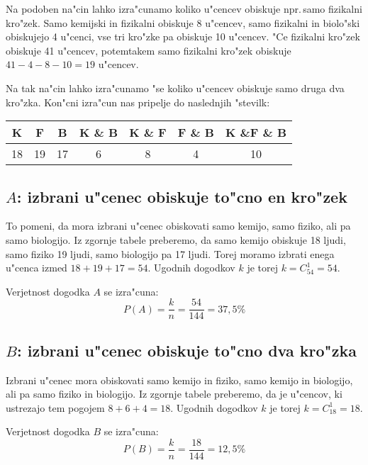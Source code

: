 \documentclass[a4paper, 12pt]{article}
\begin{document}
Na podoben na"cin lahko izra"cunamo koliko u"cencev obiskuje npr.\,samo fizikalni kro"zek. Samo kemijski in fizikalni obiskuje 8 u"cencev, samo fizikalni in biolo"ski obiskujejo 4 u"cenci, vse tri kro"zke pa obiskuje 10 u"cencev. "Ce fizikalni kro"zek obiskuje 41 u"cencev, potemtakem samo fizikalni kro"zek obiskuje $41 - 4 - 8 - 10 = 19$ u"cencev.

Na tak na"cin lahko izra"cunamo "se koliko u"cencev obiskuje samo druga dva kro"zka. Kon"cni izra"cun nas pripelje do naslednjih "stevilk:
\begin{table}[!htbp]
	\centering
	\begin{tabular}{c|c|c|c|c|c|c}
		\textbf{K} & \textbf{F} & \textbf{B} & \textbf{K \& B} & \textbf{K \& F} & \textbf{F \& B} & \textbf{K \&F \& B} \\ \hline
		18 & 19 & 17 & 6 & 8 & 4 & 10
	\end{tabular}
\end{table}

\subsection*{$A$: izbrani u"cenec obiskuje to"cno en kro"zek}
To pomeni, da mora izbrani u"cenec obiskovati samo kemijo, samo fiziko, ali pa samo biologijo. Iz zgornje tabele preberemo, da samo kemijo obiskuje 18 ljudi, samo fiziko 19 ljudi, samo biologijo pa 17 ljudi. Torej moramo izbrati enega u"cenca izmed $18  + 19 + 17 = 54$. Ugodnih dogodkov $k$ je torej $k = C_{54}^1 = 54$.

Verjetnost dogodka $A$ se izra"cuna:
\begin{equation*}
P(A) = \dfrac{k}{n} = \dfrac{54}{144} = 37,5\%
\end{equation*}

\subsection*{$B$: izbrani u"cenec obiskuje to"cno dva kro"zka}
Izbrani u"cenec mora obiskovati samo kemijo in fiziko, samo kemijo in biologijo, ali pa samo fiziko in biologijo. Iz zgornje tabele preberemo, da je u"cencov, ki ustrezajo tem pogojem $8 + 6 + 4 = 18$. Ugodnih dogodkov $k$ je torej $k = C_{18}^1 = 18$.

Verjetnost dogodka $B$ se izra"cuna:
\begin{equation*}
P(B) = \dfrac{k}{n} = \dfrac{18}{144} = 12,5\%
\end{equation*}
\end{document}
